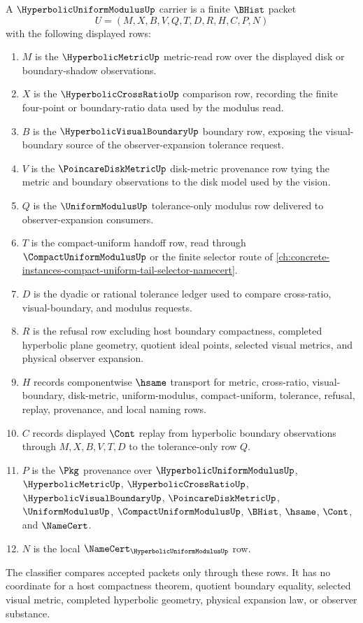 \begin{definition}
\label{def:hyperbolic-uniform-modulus-carrier}
A $\HyperbolicUniformModulusUp$ carrier is a finite $\BHist$ packet
$$
U=(M,X,B,V,Q,T,D,R,H,C,P,N)
$$
with the following displayed rows:
\begin{enumerate}
\item $M$ is the $\HyperbolicMetricUp$ metric-read row over the displayed disk or boundary-shadow observations.
\item $X$ is the $\HyperbolicCrossRatioUp$ comparison row, recording the finite four-point or boundary-ratio data used by the modulus read.
\item $B$ is the $\HyperbolicVisualBoundaryUp$ boundary row, exposing the visual-boundary source of the observer-expansion tolerance request.
\item $V$ is the $\PoincareDiskMetricUp$ disk-metric provenance row tying the metric and boundary observations to the disk model used by the vision.
\item $Q$ is the $\UniformModulusUp$ tolerance-only modulus row delivered to observer-expansion consumers.
\item $T$ is the compact-uniform handoff row, read through $\CompactUniformModulusUp$ or the finite selector route of \autoref{ch:concrete-instances-compact-uniform-tail-selector-namecert}.
\item $D$ is the dyadic or rational tolerance ledger used to compare cross-ratio, visual-boundary, and modulus requests.
\item $R$ is the refusal row excluding host boundary compactness, completed hyperbolic plane geometry, quotient ideal points, selected visual metrics, and physical observer expansion.
\item $H$ records componentwise $\hsame$ transport for metric, cross-ratio, visual-boundary, disk-metric, uniform-modulus, compact-uniform, tolerance, refusal, replay, provenance, and local naming rows.
\item $C$ records displayed $\Cont$ replay from hyperbolic boundary observations through $M,X,B,V,T,D$ to the tolerance-only row $Q$.
\item $P$ is the $\Pkg$ provenance over $\HyperbolicUniformModulusUp$, $\HyperbolicMetricUp$, $\HyperbolicCrossRatioUp$, $\HyperbolicVisualBoundaryUp$, $\PoincareDiskMetricUp$, $\UniformModulusUp$, $\CompactUniformModulusUp$, $\BHist$, $\hsame$, $\Cont$, and $\NameCert$.
\item $N$ is the local $\NameCert_{\HyperbolicUniformModulusUp}$ row.
\end{enumerate}
The classifier compares accepted packets only through these rows. It has no coordinate for a host compactness theorem, quotient boundary equality, selected visual metric, completed hyperbolic geometry, physical expansion law, or observer substance.
\end{definition}

